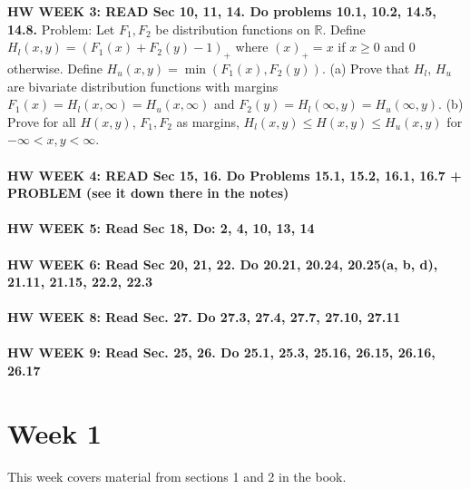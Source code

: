 \documentclass[12pt]{article}
\begin{document}
{\bf HW WEEK 3: READ Sec 10, 11, 14.  Do problems 10.1, 10.2, 14.5, 14.8.}
Problem: Let $F_1, F_2$ be distribution functions on $\mathbb{R}$.  Define $H_l(x,y) = (F_1(x) + F_2(y) - 1)_+$ where $(x)_+ = x$ if $x \ge 0$ and $0$ otherwise.  Define $H_u(x,y) = \min(F_1(x), F_2(y))$.  (a) Prove that $H_l$, $H_u$ are bivariate distribution functions with margins $F_1(x) = H_l(x, \infty) = H_u(x, \infty)$ and $F_2(y) = H_l(\infty, y) = H_u(\infty, y)$. (b) Prove for all $H(x,y)$, $F_1, F_2$ as margins, $H_l(x,y) \le H(x,y) \le H_u(x,y)$ for $-\infty < x,y < \infty$.
\\ \\
{\bf HW WEEK 4: READ Sec 15, 16.  Do Problems 15.1, 15.2, 16.1, 16.7 + PROBLEM (see it down there in the notes)}
\\ \\
{\bf HW WEEK 5: Read Sec 18, Do: 2, 4, 10, 13, 14}
\\ \\
{\bf HW WEEK 6: Read Sec 20, 21, 22.  Do 20.21, 20.24, 20.25(a, b, d), 21.11, 21.15, 22.2, 22.3}
\\ \\
{\bf HW WEEK 8: Read Sec. 27.  Do 27.3, 27.4, 27.7, 27.10, 27.11}
\\ \\
{\bf HW WEEK 9: Read Sec. 25, 26.  Do 25.1, 25.3, 25.16, 26.15, 26.16, 26.17}


\section{Week 1}
This week covers material from sections 1 and 2 in the book.
\end{document}
